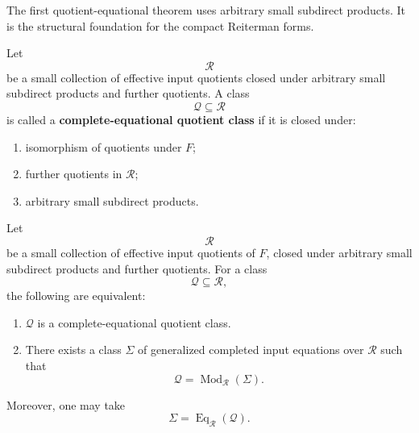 The first quotient-equational theorem uses arbitrary small subdirect products.
It is the structural foundation for the compact Reiterman forms.

\begin{definition}
\label{def:reiterman-complete-equational-quotient-class}
Let
\[
\mathcal R
\]
be a small collection of effective input quotients closed under arbitrary
small subdirect products and further quotients. A class
\[
\mathcal Q\subseteq\mathcal R
\]
is called a \textbf{complete-equational quotient class} if it is closed under:
\begin{enumerate}
\item isomorphism of quotients under \(F\);
\item further quotients in \(\mathcal R\);
\item arbitrary small subdirect products.
\end{enumerate}
\end{definition}

\begin{theorem}
\label{thm:reiterman-complete-equational-theorem}
Let
\[
\mathcal R
\]
be a small collection of effective input quotients of \(F\), closed under
arbitrary small subdirect products and further quotients. For a class
\[
\mathcal Q\subseteq\mathcal R,
\]
the following are equivalent:
\begin{enumerate}
\item \(\mathcal Q\) is a complete-equational quotient class.
\item There exists a class \(\Sigma\) of generalized completed input equations
over \(\mathcal R\) such that
\[
\mathcal Q=\operatorname{Mod}_{\mathcal R}(\Sigma).
\]
\end{enumerate}
Moreover, one may take
\[
\Sigma=\operatorname{Eq}_{\mathcal R}(\mathcal Q).
\]
\end{theorem}


